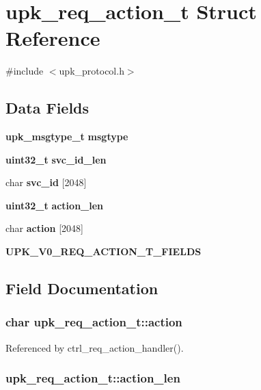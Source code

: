 \section{upk\_\-req\_\-action\_\-t Struct Reference}
\label{structupk__req__action__t}


{\ttfamily \#include $<$upk\_\-protocol.h$>$}

\subsection*{Data Fields}
\begin{DoxyCompactItemize}
\item 
{\bf upk\_\-msgtype\_\-t} {\bf msgtype}
\item 
{\bf uint32\_\-t} {\bf svc\_\-id\_\-len}
\item 
char {\bf svc\_\-id} [2048]
\item 
{\bf uint32\_\-t} {\bf action\_\-len}
\item 
char {\bf action} [2048]
\item 
{\bf UPK\_\-V0\_\-REQ\_\-ACTION\_\-T\_\-FIELDS}
\end{DoxyCompactItemize}


\subsection{Field Documentation}
\subsubsection[{action}]{\setlength{\rightskip}{0pt plus 5cm}char {\bf upk\_\-req\_\-action\_\-t::action}}\label{structupk__req__action__t_aadf21e3c57d56c869006a9ba6ff9ce2b}


Referenced by ctrl\_\-req\_\-action\_\-handler().

\subsubsection[{action\_\-len}]{ {\bf upk\_\-req\_\-action\_\-t::action\_\-len}}\label{structupk__req__action__t_a187b6bb02ce52873bf0ed82e840766c9}

